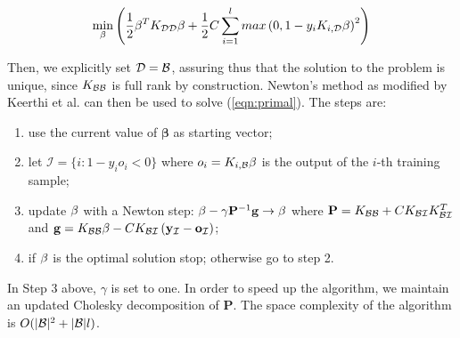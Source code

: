 \begin{equation} \label{eqn:primal}
  \min_{\mathbf{\beta}} \left( 
      \frac{1}{2} \mathbf{\beta}^T K_{\mathcal{D}\mathcal{D}} \mathbf{\beta}
    + \frac{1}{2} C \sum_{i=1}^l max \left(0,1-y_i K_{i,\mathcal{D}} \mathbf{\beta} \right)^2
  \right)
\end{equation}

Then, we explicitly set $\mathcal{D} = \mathcal{B}$, assuring thus that the solution to
the problem is unique, since $K_{\mathcal{B}\mathcal{B}}$ is full rank by
construction. Newton's method as modified by Keerthi et
al. \cite{KeerthiDC05,KeerthiCDC06} can then be used to solve
(\ref{eqn:primal}). The steps are:

\begin{enumerate}

   \item use the current value of $\boldsymbol{\beta}$ as starting
     vector;

   \item let $\mathcal{I} = \{ i: 1-y_i o_i<0 \}$ where $o_i =
     K_{i,\mathcal{B}} \mathbf{\beta}$ is the output of the $i$-th training sample;

   \item update $\mathbf{\beta}$ with a Newton step:
     $\mathbf{\beta} - \gamma \mathbf{P}^{-1}\mathbf{g} \rightarrow \mathbf{\beta}$ where
     $\mathbf{P} = K_{\mathcal{B}\mathcal{B}} + C K_{\mathcal{B}\mathcal{I}} K_{\mathcal{B}\mathcal{I}}^T$ and
     $\mathbf{g} = K_{\mathcal{B}\mathcal{B}} \mathbf{\beta} - C K_{\mathcal{B}\mathcal{I}}
        \left( \mathbf{y}_{\mathcal{I}}-\mathbf{o}_{\mathcal{I}}\right)$;

   \item if $\mathbf{\beta}$ is the optimal solution stop; otherwise go to step
     2.

\end{enumerate}

In Step $3$ above, $\gamma$ is set to one. In order to speed up the
algorithm, we maintain an updated Cholesky decomposition of
$\mathbf{P}$. The space complexity of the algorithm is
$O(|\mathcal{B}|^2+|\mathcal{B}|l)$.
